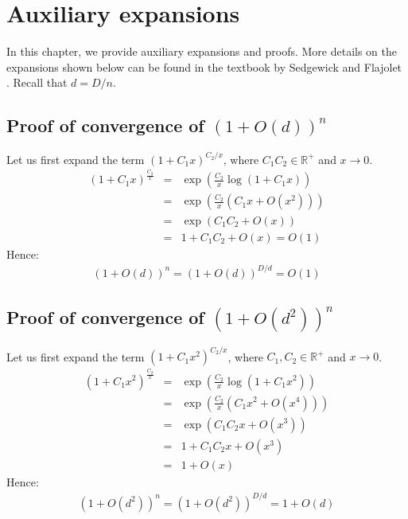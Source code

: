 \chapter{Auxiliary expansions}\label{sec:aux}

In this chapter, we provide auxiliary expansions and proofs. More details on the expansions shown below can be found in the textbook by Sedgewick and Flajolet \cite{Sedgewick95}. Recall that $d = D / n$.

\section{Proof of convergence of $(1+ O(d))^n$}

Let us first expand the term $(1+C_1x)^{C_2/x}$, where $C_1 C_2 \in \mathbb{R}^+$ and $x \rightarrow 0$.
\begin{eqnarray}
(1+C_1x)^{\frac{C_2}{x}}
&= & \exp \left(\frac{C_2}{x}\log (1+C_1x) \right)\\
&= & \exp \left(\frac{C_2}{x}(C_1x + O(x^2)) \right)\\
&= & \exp ( C_1C_2 + O(x) ) \\
&=& 1 + C_1C_2 + O(x) = O(1)
\end{eqnarray}
Hence:
\begin{eqnarray}
(1+ O(d))^n = (1+ O(d))^{D/d} = O(1)
\end{eqnarray}

\section{Proof of convergence of $(1+ O(d^2))^n$}

Let us first expand the term $(1+C_1x^2)^{C_2/x}$, where $C_1,C_2 \in \mathbb{R}^+$ and $x \rightarrow 0$.
\begin{eqnarray}
(1+C_1x^2)^{\frac{C_2}{x}}
&= & \exp \left(\frac{C_2}{x}\log (1+C_1x^2) \right)\\
&= & \exp \left(\frac{C_2}{x}(C_1x^2 + O(x^4)) \right)\\
&= & \exp ( C_1C_2x + O(x^3) ) \\
&=& 1 + C_1C_2x + O(x^3)\\
&=& 1 + O(x)
\end{eqnarray}
Hence:
\begin{eqnarray}
(1+ O(d^2))^n = (1+ O(d^2))^{D/d} = 1 + O(d)
\end{eqnarray}
